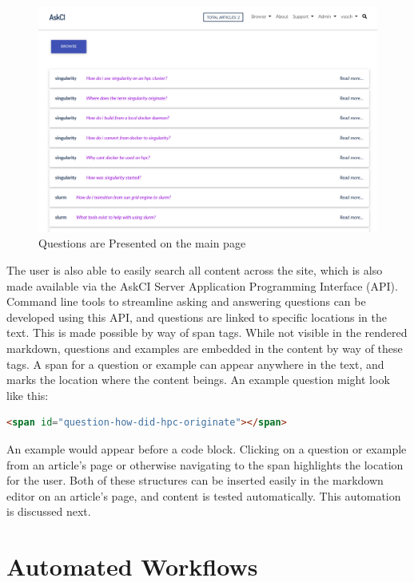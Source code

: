 \documentclass{jors}
\begin{document}
\begin{figure}[h]
\caption{Questions are Presented on the main page}
\centering
\includegraphics[width=1.0\textwidth]{figure1.png}
\end{figure}

The user is also able to easily search all content across the site, which is also made available
via the AskCI Server Application Programming Interface (API). Command line tools to streamline
asking and answering questions can be developed using this API, and questions are linked
to specific locations in the text. This is made possible by way of span tags. 
While not visible in the rendered markdown, questions and examples are embedded in the content
by way of these tags. A span for a question or example can appear anywhere in the text, and marks the location where
the content beings. An example question might look like this:

\begin{lstlisting}[language=html]
<span id="question-how-did-hpc-originate"></span>
\end{lstlisting}


An example would appear before a code block.  Clicking on a question or example from an article's page or otherwise navigating to the span highlights the location for the user. Both of these structures can be inserted easily in the markdown editor on an article's page, and content is tested automatically. This automation is discussed next.

\thispagestyle{empty} 
\section*{Automated Workflows}
\end{document}

